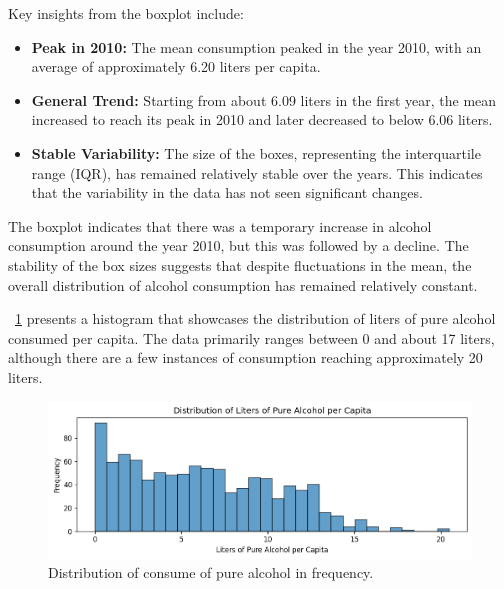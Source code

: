             Key insights from the boxplot include:

            \begin{itemize}
                \item \textbf{Peak in 2010:} The mean consumption peaked in the year 2010, with an average of approximately 6.20 liters per capita.

                \item \textbf{General Trend:} Starting from about 6.09 liters in the first year, the mean increased to reach its peak in 2010 and later decreased to below 6.06 liters.

                \item \textbf{Stable Variability:} The size of the boxes, representing the interquartile range (IQR), has remained relatively stable over the years. This indicates that the variability in the data has not seen significant changes.

            \end{itemize}

            The boxplot indicates that there was a temporary increase in alcohol consumption around the year 2010, but this was followed by a decline. The stability of the box sizes suggests that despite fluctuations in the mean, the overall distribution of alcohol consumption has remained relatively constant.

            \figurename~\ref{fig:du-alcohol-distribution} presents a histogram that showcases the distribution of liters of pure alcohol consumed per capita. The data primarily ranges between 0 and about 17 liters, although there are a few instances of consumption reaching approximately 20 liters.

            \begin{figure}[H]
                \centering
                \includegraphics[scale=0.8]{images/du_alcohol_li_of_pu_al_pe_ca_freq}
                \caption{Distribution of consume of pure alcohol in frequency.}
                \label{fig:du-alcohol-distribution}
            \end{figure}


